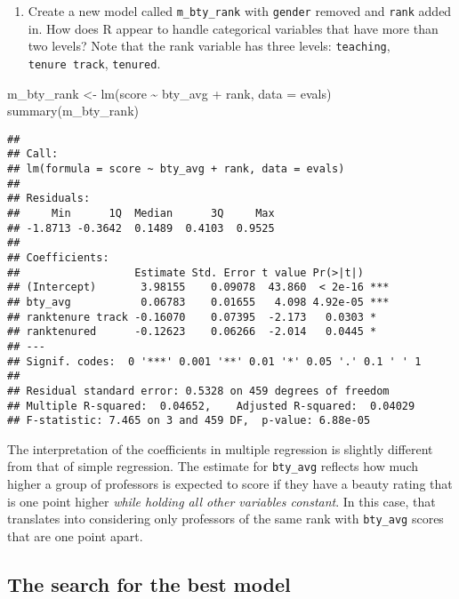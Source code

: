\documentclass[
]{article}
\newenvironment{Shaded}{\begin{snugshade}}{\end{snugshade}}
\newcommand{\AttributeTok}[1]{\textcolor[rgb]{0.77,0.63,0.00}{#1}}
\newcommand{\FunctionTok}[1]{\textcolor[rgb]{0.00,0.00,0.00}{#1}}
\newcommand{\NormalTok}[1]{#1}
\newcommand{\OtherTok}[1]{\textcolor[rgb]{0.56,0.35,0.01}{#1}}
\newcommand{\SpecialCharTok}[1]{\textcolor[rgb]{0.00,0.00,0.00}{#1}}
\providecommand{\tightlist}{%
  \setlength{\itemsep}{0pt}\setlength{\parskip}{0pt}}
\begin{document}
\begin{enumerate}
\def\labelenumi{\arabic{enumi}.}
\setcounter{enumi}{9}
\tightlist
\item
  Create a new model called \texttt{m\_bty\_rank} with \texttt{gender}
  removed and \texttt{rank} added in. How does R appear to handle
  categorical variables that have more than two levels? Note that the
  rank variable has three levels: \texttt{teaching},
  \texttt{tenure\ track}, \texttt{tenured}.
\end{enumerate}

\begin{Shaded}
\begin{Highlighting}[]
\NormalTok{m\_bty\_rank }\OtherTok{\textless{}{-}} \FunctionTok{lm}\NormalTok{(score }\SpecialCharTok{\textasciitilde{}}\NormalTok{ bty\_avg }\SpecialCharTok{+}\NormalTok{ rank, }\AttributeTok{data =}\NormalTok{ evals)}
\FunctionTok{summary}\NormalTok{(m\_bty\_rank)}
\end{Highlighting}
\end{Shaded}

\begin{verbatim}
## 
## Call:
## lm(formula = score ~ bty_avg + rank, data = evals)
## 
## Residuals:
##     Min      1Q  Median      3Q     Max 
## -1.8713 -0.3642  0.1489  0.4103  0.9525 
## 
## Coefficients:
##                  Estimate Std. Error t value Pr(>|t|)    
## (Intercept)       3.98155    0.09078  43.860  < 2e-16 ***
## bty_avg           0.06783    0.01655   4.098 4.92e-05 ***
## ranktenure track -0.16070    0.07395  -2.173   0.0303 *  
## ranktenured      -0.12623    0.06266  -2.014   0.0445 *  
## ---
## Signif. codes:  0 '***' 0.001 '**' 0.01 '*' 0.05 '.' 0.1 ' ' 1
## 
## Residual standard error: 0.5328 on 459 degrees of freedom
## Multiple R-squared:  0.04652,    Adjusted R-squared:  0.04029 
## F-statistic: 7.465 on 3 and 459 DF,  p-value: 6.88e-05
\end{verbatim}

The interpretation of the coefficients in multiple regression is
slightly different from that of simple regression. The estimate for
\texttt{bty\_avg} reflects how much higher a group of professors is
expected to score if they have a beauty rating that is one point higher
\emph{while holding all other variables constant}. In this case, that
translates into considering only professors of the same rank with
\texttt{bty\_avg} scores that are one point apart.

\hypertarget{the-search-for-the-best-model}{%
\subsection{The search for the best
model}\label{the-search-for-the-best-model}}
\end{document}

